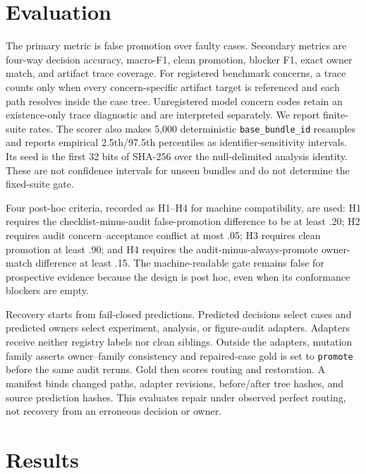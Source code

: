 \documentclass[11pt]{article}
\begin{document}
\section{Evaluation}

The primary metric is false promotion over faulty cases. Secondary metrics are
four-way decision accuracy, macro-F1, clean promotion, blocker F1, exact owner
match, and artifact trace coverage. For registered benchmark concerns, a trace
counts only when every concern-specific artifact target is referenced and each
path resolves inside the case tree. Unregistered model concern codes retain an
existence-only trace diagnostic and are interpreted separately. We report
finite-suite rates. The scorer also makes
5,000 deterministic \texttt{base\_bundle\_id} resamples and reports empirical
2.5th/97.5th percentiles as identifier-sensitivity intervals. Its seed is the
first 32 bits of SHA-256 over the null-delimited analysis identity. These are
not confidence intervals for unseen bundles and do not determine the
fixed-suite gate.

Four post-hoc criteria, recorded as H1--H4 for machine compatibility, are used:
H1 requires the checklist-minus-audit false-promotion difference to be at least
.20; H2 requires audit concern--acceptance conflict at most .05; H3 requires
clean promotion at least .90; and H4 requires the audit-minus-always-promote
owner-match difference at least .15. The machine-readable gate remains false for prospective evidence
because the design is post hoc, even when its conformance blockers are empty.

Recovery starts from fail-closed predictions. Predicted decisions select cases
and predicted owners select experiment, analysis, or figure-audit adapters.
Adapters receive neither registry labels nor clean siblings. Outside the
adapters, mutation family asserts owner--family consistency and repaired-case
gold is set to \texttt{promote} before the same audit reruns. Gold then scores
routing and restoration. A manifest
binds changed paths, adapter revisions, before/after tree hashes, and source
prediction hashes. This evaluates repair under observed perfect routing, not
recovery from an erroneous decision or owner.

\section{Results}
\end{document}
